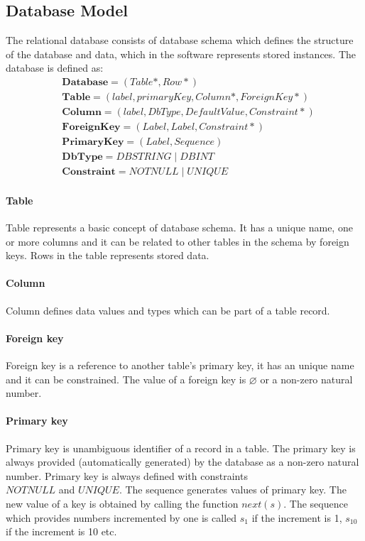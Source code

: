 \documentclass[runningheads]{comsis}
\begin{document}
\subsection{Database Model}
The relational database consists of database schema which defines the structure of the database and data, which in the software represents stored instances. The database is defined as:
\begin{align}
&	\mathbf{Database} = ( Table*, Row* )\\
&	\mathbf{Table} = (label, primaryKey, Column*, ForeignKey*)\\
&	\mathbf{Column} = (label, DbType, DefaultValue, Constraint*) \\
&	\mathbf{ForeignKey} = (Label, Label, Constraint*) \\
&	\mathbf{PrimaryKey} =  ( Label, Sequence ) \\
&	\mathbf{DbType} = DBSTRING \; | \; DBINT\\
&	\mathbf{Constraint} = NOTNULL \; | \; UNIQUE 
\end{align}

\paragraph{Table} Table represents a basic concept of database schema. It has a unique name, one or more columns and it can be related to other tables in the schema by foreign keys. Rows in the table represents stored data.

\paragraph{Column} Column defines data values and types which can be part of a table record.

\paragraph{Foreign key} Foreign key is a reference to another table's primary key, it has an unique name and it can be constrained. The value of a foreign key is $\varnothing$ or a non-zero natural number.

\paragraph{Primary key} Primary key is unambiguous identifier of a record in a table. The primary key is always provided (automatically generated) by the database as a non-zero natural number. Primary key is always defined with constraints\\ $NOTNULL$ and $UNIQUE$. The sequence generates values of primary key. The new value of a key is obtained by calling the function $next(s)$. The sequence which provides numbers incremented by one is called $s_1$ if the increment is 1, $s_{10}$ if the increment is 10 etc.
\end{document}
